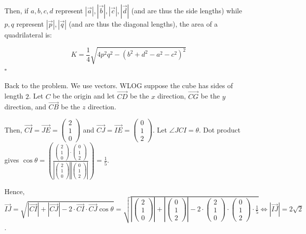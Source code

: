 \begin{enumerate}
 Then, if $a, b, c, d$ represent $|\vec{a}|, |\vec{b}|, |\vec{c}|, |\vec{d}|$ (and are thus the side lengths) while $p, q$ represent $|\vec{p}|, |\vec{q}|$ (and are thus the diagonal lengths), the area of a quadrilateral is:

 
 \[K = \frac{1}{4} \sqrt{4p^2q^2 - (b^2 + d^2 - a^2 - c^2)^2}\] $\square$

 Back to the problem. We use vectors. WLOG suppose the cube has sides of length $2$. Let $C$ be the origin and let $\vec{CD}$ be the $x$ direction, $\vec{CG}$ be the $y$ direction, and $\vec{CB}$ be the $z$ direction. 

 Then, $\vec{CI}=\vec{JE}=\begin{pmatrix} 2\\1\\0\end{pmatrix}$ and $\vec{CJ}=\vec{IE}=\begin{pmatrix} 0\\1\\2\end{pmatrix}$. Let $\angle JCI=\theta$. Dot product gives $\cos \theta=\left(\frac{\begin{pmatrix} 2\\1\\0\end{pmatrix} \cdot \begin{pmatrix} 0\\1\\2\end{pmatrix}}{|\begin{pmatrix} 2\\1\\0\end{pmatrix}||\begin{pmatrix} 0\\1\\2\end{pmatrix}|}\right)=\frac 15.$

 Hence, $\vec {IJ}=\sqrt{|\vec{CI}|+|\vec{CJ}|-2\cdot \vec{CI}\cdot \vec{CJ}\cos \theta}=\sqrt{|\begin{pmatrix} 2\\1\\0\end{pmatrix}|+|\begin{pmatrix} 0\\1\\2\end{pmatrix}|-2\cdot \begin{pmatrix} 2\\1\\0\end{pmatrix} \cdot\begin{pmatrix} 0\\1\\2\end{pmatrix} \cdot \frac 15} \iff |\vec{IJ}|=2\sqrt2$.


\end{enumerate}
